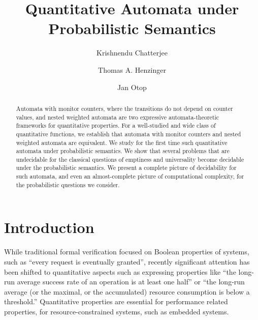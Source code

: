 \documentclass{lmcs}
\begin{document}
\title{Quantitative Automata under Probabilistic Semantics}


\author[K.~Chatterjee]{Krishnendu Chatterjee}
\author[T.A.~Henzinger]{Thomas A. Henzinger}
\address{IST Austria}
\author[J.~Otop]{Jan Otop}
\address{University of Wroc\l{}aw}


\maketitle

\begin{abstract}
Automata with monitor counters, where the transitions do not
depend on counter values, and nested weighted automata are
two expressive automata-theoretic frameworks for quantitative
properties.
For a well-studied and wide class of quantitative functions,
we establish that automata with monitor counters and nested weighted
automata are equivalent.
We study for the first time such quantitative automata under
probabilistic semantics.
We show that several problems that are undecidable for the
classical questions of emptiness and universality become
decidable under the probabilistic semantics.
We present a complete picture of decidability for such automata,
and even an almost-complete picture of computational complexity,
for the probabilistic questions we consider.

 \end{abstract}

\section{Introduction}



While traditional formal verification focused on Boolean properties
of systems, such as ``every request is eventually granted'',
recently significant attention has been shifted to quantitative aspects
such as expressing properties like ``the long-run average success rate
of an operation is at least one half'' or ``the long-run average
(or the maximal, or the accumulated) resource consumption is below a threshold.''
Quantitative properties are essential for performance related properties,
for resource-constrained systems, such as embedded systems.
\end{document}
